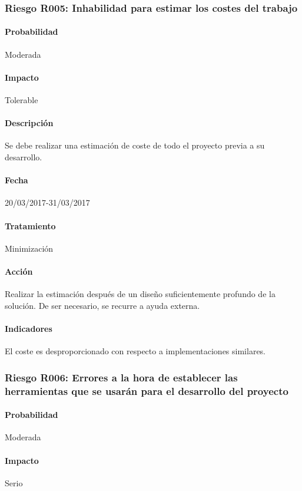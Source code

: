 \documentclass[10pt,a4paper]{article}
\begin{document}
			\subsubsection{Riesgo R005: Inhabilidad para estimar los costes del trabajo}
				\paragraph{Probabilidad} Moderada
				\paragraph{Impacto}	Tolerable
				\paragraph{Descripción} Se debe realizar una estimación de coste de todo el proyecto previa a su desarrollo.
				\paragraph{Fecha} 20/03/2017-31/03/2017 %
				\paragraph{Tratamiento} Minimización %
				\paragraph{Acción} Realizar la estimación después de un diseño suficientemente profundo de la solución. De ser necesario, se recurre a ayuda externa. %
				\paragraph{Indicadores} El coste es desproporcionado con respecto a implementaciones similares. %
				
			\subsubsection{Riesgo R006: Errores a la hora de establecer las herramientas que se usarán para el desarrollo del proyecto}
				\paragraph{Probabilidad} Moderada
				\paragraph{Impacto}	Serio
\end{document}
